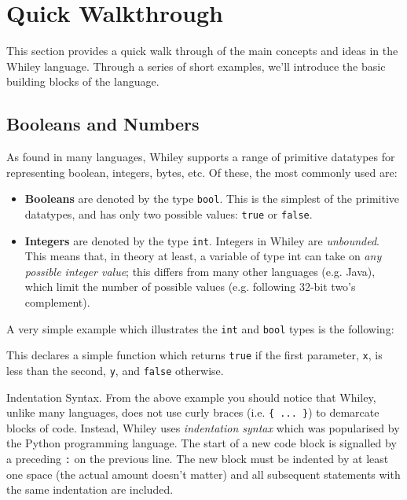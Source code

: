 \newpage
\section{Quick Walkthrough}
This section provides a quick walk through of the main concepts and
ideas in the Whiley language.  Through a series of short examples,
we'll introduce the basic building blocks of the language.

\subsection{Booleans and Numbers}

As found in many languages, Whiley supports a range of primitive datatypes for representing boolean, integers, bytes, etc.  Of these, the most commonly used are:

\begin{itemize}

\item {\bf Booleans} are denoted by the type \lstinline{bool}.  This is the simplest of the primitive datatypes, and has only two possible values: \lstinline{true} or \lstinline{false}.

\item {\bf Integers} are denoted by the type \lstinline{int}.  Integers in Whiley are {\em unbounded}. This means that, in theory at least, a variable of type int can take on {\em any possible integer value}; this differs from many other languages (e.g. Java), which limit the number of possible values (e.g. following 32-bit two's complement).

\end{itemize}


\noindent A very simple example which illustrates the \lstinline{int} and
\lstinline{bool} types is the following:



This declares a simple function which returns \lstinline{true} if the
first parameter, \lstinline{x}, is less than the second,
\lstinline{y}, and \lstinline{false} otherwise.

\begin{insight}{Indentation Syntax.}
  From the above example you should notice that Whiley, unlike many
  languages, does not use curly braces (i.e. \verb+{ ... }+) to
  demarcate blocks of code.  Instead, Whiley uses {\em indentation
    syntax} which was popularised by the Python programming language.
  The start of a new code block is signalled by a preceding \verb+:+
  on the previous line.  The new block must be indented by at least
  one space (the actual amount doesn't matter) and all subsequent
  statements with the same indentation are included.
\end{insight}

